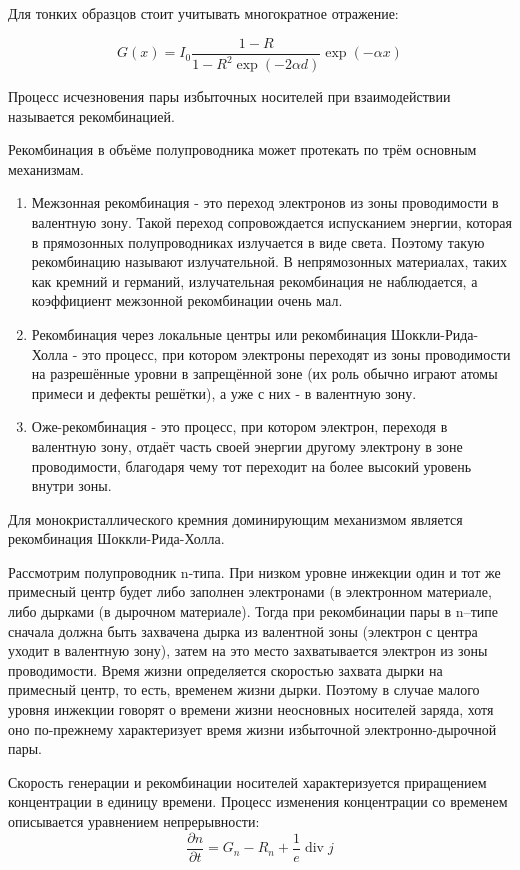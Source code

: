 Для тонких образцов стоит учитывать многократное отражение:

\begin{equation}
G(x) = I_{0} \frac{1-R}{1-R^{2} \exp(-2 \alpha d)} \exp(-\alpha x)
\end{equation}

Процесс исчезновения пары избыточных носителей при взаимодействии называется рекомбинацией.

Рекомбинация в объёме полупроводника может протекать по трём основным механизмам.

\begin{enumerate}
\item Межзонная рекомбинация - это переход электронов из зоны проводимости в валентную зону. Такой переход сопровождается испусканием энергии, которая в прямозонных полупроводниках излучается в виде света. Поэтому такую рекомбинацию называют излучательной. В непрямозонных материалах, таких как кремний и германий, излучательная рекомбинация не наблюдается, а коэффициент межзонной рекомбинации очень мал.
\item Рекомбинация через локальные центры или рекомбинация Шоккли-Рида-Холла - это процесс, при котором электроны переходят из зоны проводимости на разрешённые уровни в запрещённой зоне (их роль обычно играют атомы примеси и дефекты решётки), а уже с них - в валентную зону.
\item Оже-рекомбинация - это процесс, при котором электрон, переходя в валентную зону, отдаёт часть своей энергии другому электрону в зоне проводимости, благодаря чему тот переходит на более высокий уровень внутри зоны.
\end{enumerate}

Для монокристаллического кремния доминирующим механизмом является рекомбинация Шоккли-Рида-Холла.

Рассмотрим полупроводник n-типа. При низком уровне инжекции один и тот же примесный центр будет либо заполнен электронами (в электронном материале, либо дырками (в дырочном материале). Тогда при рекомбинации пары в n–типе сначала должна быть захвачена дырка из валентной зоны (электрон с центра уходит в валентную зону), затем на это место захватывается электрон из зоны проводимости. Время жизни определяется скоростью захвата дырки на примесный центр, то есть, временем жизни дырки. Поэтому в случае малого уровня инжекции говорят о времени жизни неосновных носителей заряда, хотя оно по-прежнему характеризует время жизни избыточной электронно-дырочной пары.

Скорость генерации и рекомбинации носителей характеризуется приращением концентрации в единицу времени. Процесс изменения концентрации со временем описывается уравнением непрерывности:
\begin{equation}
\frac{\partial n}{\partial t} = G_{n} - R_{n} + \frac{1}{e} \operatorname{div} j
\end{equation}

